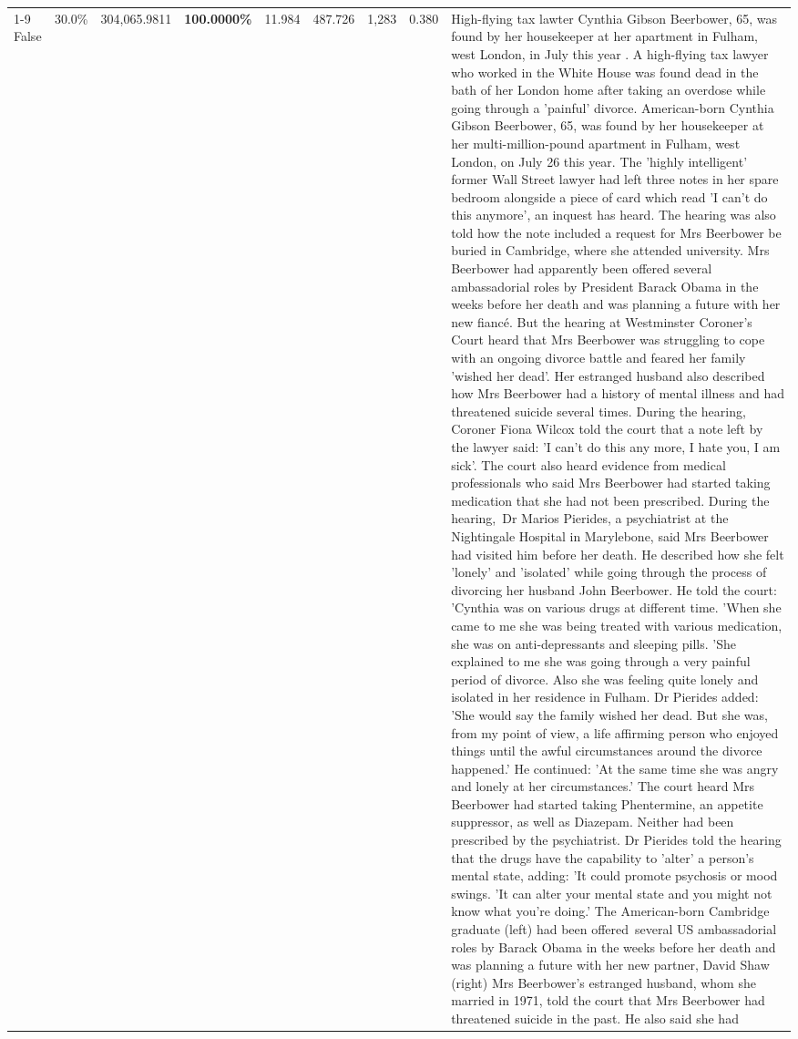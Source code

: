 \begin{table}[H]
\begin{tabular}{lllrlllll}
\cline{1-9}
False & 30.0\% & \color{red} 304,065.9811 & \bfseries \color{red} 100.0000\% & 11.984 & 487.726 & 1,283 & 0.380 & High-flying tax lawter Cynthia Gibson Beerbower, 65, was found by her housekeeper at her apartment in Fulham, west London, in July this year . A high-flying tax lawyer who worked in the White House was found dead in the bath of her London home after taking an overdose while going through a 'painful' divorce. American-born Cynthia Gibson Beerbower, 65, was found by her housekeeper at her multi-million-pound apartment in Fulham, west London, on July 26 this year. The 'highly intelligent' former Wall Street lawyer had left three notes in her spare bedroom alongside a piece of card which read 'I can't do this anymore', an inquest has heard. The hearing was also told how the note included a request for Mrs Beerbower be buried in Cambridge, where she attended university. Mrs Beerbower had apparently been offered several ambassadorial roles by President Barack Obama in the weeks before her death and was planning a future with her new fiancé. But the hearing at Westminster Coroner's Court heard that Mrs Beerbower was struggling to cope with an ongoing divorce battle and feared her family 'wished her dead'. Her estranged husband also described how Mrs Beerbower had a history of mental illness and had threatened suicide several times. During the hearing, Coroner Fiona Wilcox told the court that a note left by the lawyer said: 'I can't do this any more, I hate you, I am sick'. The court also heard evidence from medical professionals who said Mrs Beerbower had started taking medication that she had not been prescribed. During the hearing, Dr Marios Pierides, a psychiatrist at the Nightingale Hospital in Marylebone, said Mrs Beerbower had visited him before her death. He described how she felt 'lonely' and 'isolated' while going through the process of divorcing her husband John Beerbower. He told the court: 'Cynthia was on various drugs at different time. 'When she came to me she was being treated with various medication, she was on anti-depressants and sleeping pills. 'She explained to me she was going through a very painful period of divorce. Also she was feeling quite lonely and isolated in her residence in Fulham. Dr Pierides added: 'She would say the family wished her dead. But she was, from my point of view, a life affirming person who enjoyed things until the awful circumstances around the divorce happened.' He continued: 'At the same time she was angry and lonely at her circumstances.' The court heard Mrs Beerbower had started taking Phentermine, an appetite suppressor, as well as Diazepam. Neither had been prescribed by the psychiatrist. Dr Pierides told the hearing that the drugs have the capability to 'alter' a person's mental state, adding: 'It could promote psychosis or mood swings. 'It can alter your mental state and you might not know what you're doing.' The American-born Cambridge graduate (left) had been offered several US ambassadorial roles by Barack Obama in the weeks before her death and was planning a future with her new partner, David Shaw (right) Mrs Beerbower's estranged husband, whom she married in 1971, told the court that Mrs Beerbower had threatened suicide in the past. He also said she had 
\end{tabular}
\end{table}
